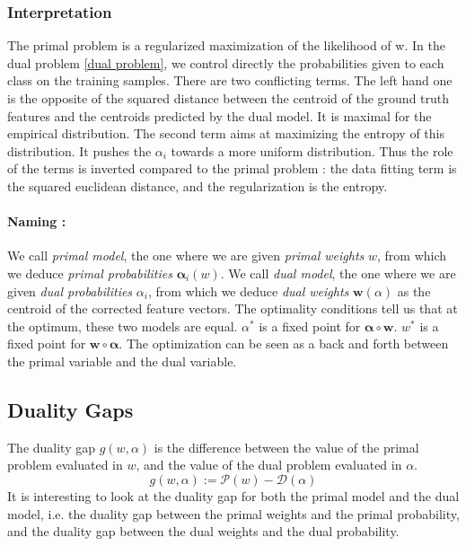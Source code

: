 \documentclass{article}
\DeclareMathOperator{\1}{\mathbb{1}}
\begin{document}
\subsubsection{Interpretation}
The primal problem is a regularized maximization of the likelihood of w. 
In the dual problem \ref{dual problem}, we control directly the probabilities given to each class on the training samples.
There are two conflicting terms.
The left hand one is the opposite of the squared distance between the centroid of the ground truth features and the centroids predicted by the dual model. It is maximal for the empirical distribution.
The second term aims at maximizing the entropy of this distribution.
It pushes the $\alpha_i$ towards a more uniform distribution.
Thus the role of the terms is inverted compared to the primal problem : the data fitting term is the squared euclidean distance, and the regularization is the entropy.

\paragraph{Naming :} 
We call \textit{primal model}, the one where we are given \textit{primal weights} $w$, from which we deduce \textit{primal probabilities} $\bm \alpha_i(w)$.
We call \textit{dual model}, the one where we are given \textit{dual probabilities} $\alpha_i$, from which we deduce \textit{dual weights} $\bm w(\alpha)$ as the centroid of the corrected feature vectors.
The optimality conditions tell us that at the optimum, these two models are equal.
$\alpha^*$ is a fixed point for $\bm \alpha \circ \bm w$.
$w^*$ is a fixed point for $\bm w \circ \bm \alpha$.
The optimization can be seen as a back and forth between the primal variable and the dual variable.

\subsection{Duality Gaps}

The duality gap $g(w,\alpha)$ is the difference between the value  of the primal problem evaluated in $w$, and the value of the dual problem evaluated in $\alpha$.
\begin{equation*}
	g(w,\alpha) := \mathscr P(w) - \mathscr D(\alpha)
\end{equation*}
It is interesting to look at the duality gap for both the primal model and the dual model, i.e. the duality gap between the primal weights and the primal probability, and the duality gap between the dual weights and the dual probability.
\end{document}
